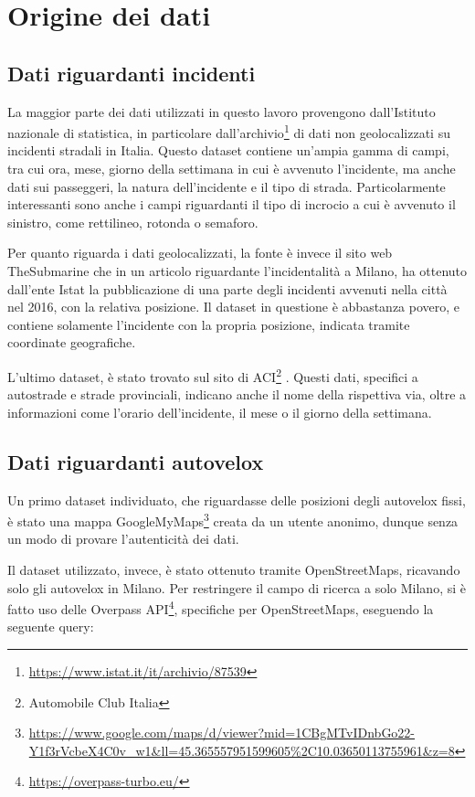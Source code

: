 \documentclass[a4paper]{report}
\begin{document}
\chapter{Origine dei dati}

\section{Dati riguardanti incidenti}
La maggior parte dei dati utilizzati in questo lavoro provengono 
dall'Istituto nazionale di statistica, in particolare 
dall'archivio\footnote{\url{https://www.istat.it/it/archivio/87539}}
di dati non geolocalizzati su incidenti stradali in Italia.
Questo dataset contiene un'ampia gamma di campi, tra cui ora, 
mese, giorno della settimana in cui è avvenuto l'incidente, 
ma anche dati sui passeggeri, la natura dell'incidente e il tipo di strada. 
Particolarmente interessanti sono anche i campi riguardanti il tipo di incrocio 
a cui è avvenuto il sinistro, come rettilineo, rotonda o semaforo.

Per quanto riguarda i dati geolocalizzati, 
la fonte è invece il sito web TheSubmarine \cite{SUBMARINE:1}
che in un articolo riguardante l'incidentalità a Milano, 
ha ottenuto dall'ente Istat la pubblicazione di una parte degli 
incidenti avvenuti nella città nel 2016, con la relativa posizione.
Il dataset in questione è abbastanza povero, e contiene solamente 
l'incidente con la propria posizione, indicata tramite coordinate geografiche.

L'ultimo dataset, è stato trovato sul sito di 
ACI\footnote{Automobile Club Italia} \cite{ACI:1}.
Questi dati, specifici a autostrade e strade provinciali, indicano anche il 
nome della rispettiva via, oltre a informazioni come l'orario dell'incidente, 
il mese o il giorno della settimana.

\section{Dati riguardanti autovelox}
Un primo dataset individuato, che riguardasse delle posizioni degli autovelox fissi, 
è stato una mappa 
GoogleMyMaps\footnote{\url{https://www.google.com/maps/d/viewer?mid=1CBgMTvIDnbGo22-Y1f3rVcbeX4C0v_w1&ll=45.365557951599605\%2C10.03650113755961&z=8}} 
creata da un utente anonimo, dunque senza un modo di provare l'autenticità dei dati.

Il dataset utilizzato, invece, è stato ottenuto tramite OpenStreetMaps, ricavando 
solo gli autovelox in Milano. 
Per restringere il campo di ricerca a solo Milano, si è fatto uso delle 
Overpass API\footnote{\url{https://overpass-turbo.eu/}}, 
specifiche per OpenStreetMaps, eseguendo la seguente query: 
\end{document}
